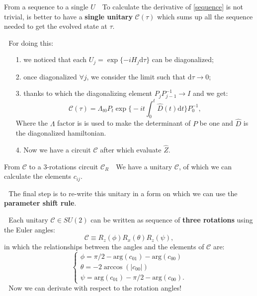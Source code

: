 \documentclass[8pt, xcolor={svgnames}, hyperref={colorlinks, linkcolor=black, citecolor=amethyst, urlcolor=amethyst}]{beamer}
\begin{document}
\begin{frame}{From a sequence to a single $U$}
\large
\faArrowCircleRight\,\, To calculate the derivative of \eqref{sequence}
is not trivial, is better to have a \textbf{single unitary} $\mathcal{C}(\tau)$ 
which sums up all the sequence needed to get the evolved state at $\tau$.
\pause

\faArrowCircleRight\,\, For doing this:
\pause
\begin{itemize}[noitemsep]
    \item[1.] we noticed that each $U_j=\exp\{-iH_j\text{d}\tau \}$ can be 
    diagonalized;
    \pause
    \item[2.] once diagonalized $\forall j$, we consider the limit
    such that $\text{d}\tau \to 0$;
    \pause
    \item[3.] thanks to which the diagonalizing element $P_j P_{j-1}^{-1}\to I$ 
    and we get:
    \begin{equation}
  \mathcal{C}(\tau) = \Lambda_{t0}
   P_t \exp \bigg\{-i t \int_{0}^{t} \hat{D}(t) \text{d}t \bigg\} P_0^{-1}, 
    \end{equation}  
    Where the $\Lambda$ factor is is used to make the determinant of $P$ be one
    and $\hat{D}$ is the diagonalized hamiltonian.
    \pause
    \item[4.] Now we have a circuit $\mathcal{C}$ after which evaluate $\hat{Z}$.
\end{itemize}

\end{frame}

\begin{frame}{From $\mathcal{C}$ to a 3-rotations circuit $\mathcal{C}_R$}
\large
\faArrowCircleRight\,\, We have a unitary 
$\mathcal{C}$, of which we can calculate the elements $c_{ij}$.
\pause 

\faArrowCircleRight\,\, The final step is to re-write this unitary in a form on 
which we can use the \textbf{parameter shift rule}. 
\pause 

\faArrowCircleRight\,\, Each unitary $\mathcal{C}\in SU(2)$ can be
written as sequence of \textbf{three rotations} using the Euler angles:
\begin{equation}
  \mathcal{C} \equiv R_z(\phi)R_x(\theta)R_z(\psi),
\end{equation}
\pause 
in which the relationships between the angles and the 
elements of $\mathcal{C}$ are:
\begin{equation}
  \begin{cases}
    \phi = \pi/2 - \text{arg}(c_{01}) - \text{arg}(c_{00}) \\
    \theta = -2\arccos(|c_{00}|) \\
    \psi = \text{arg}(c_{01}) - \pi/2 - \text{arg}(c_{00}).
  \end{cases}
\end{equation}
\pause 
\faArrowCircleRight\,\, Now we can derivate with respect to the rotation angles!

\end{frame}
\end{document}

